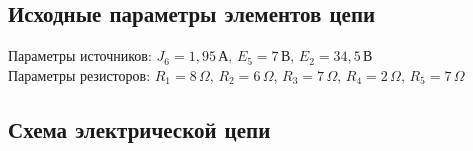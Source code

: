 \subsection*{Исходные параметры элементов цепи}

Параметры источников: \(J_6 = 1{,}95 \, \text{А}, \, E_5 = 7 \, \text{В}, \, E_2 = 34{,}5 \, \text{В} \) \\
Параметры резисторов: \(R_1 = 8 \, \Omega, \, R_2 = 6 \, \Omega, \, R_3 = 7 \, \Omega, \, R_4 = 2 \, \Omega, \, R_5 = 7 \, \Omega\)

\subsection*{Схема электрической цепи}


